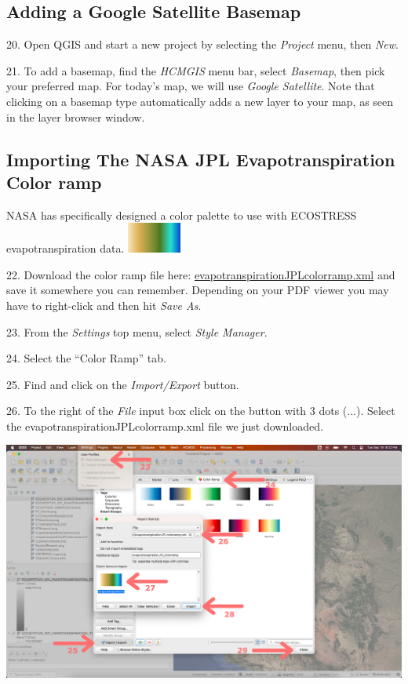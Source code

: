 \documentclass[oneside,a4paper,11pt,explicit]{book}
\begin{document}
\subsection{Adding a Google Satellite Basemap}

20. Open QGIS and start a new project by selecting the \textit{Project} menu, then \textit{New}.

21. To add a basemap, find the \textit{HCMGIS} menu bar, select \textit{Basemap}, then pick your preferred map. For today's map, we will use \textit{Google Satellite}. Note that clicking on a basemap type automatically adds a new layer to your map, as seen in the layer browser window.

\subsection{Importing The NASA JPL Evapotranspiration Color ramp}

NASA has specifically designed a color palette to use with ECOSTRESS evapotranspiration data. \includegraphics[height= 1cm]{ETcolors.png} 

\vspace{.5em}

22. Download the color ramp file here: \href{https://jeremydforsythe.github.io/icecream-tutorials/Tutorial6_Evaportranspiration1/evapotranspirationJPLcolorramp.xml}{evapotranspirationJPLcolorramp.xml} and save it somewhere you can remember. Depending on your PDF viewer you may have to right-click and then hit \textit{Save As}.

23. From the \textit{Settings} top menu, select \textit{Style Manager}.

24. Select the ``Color Ramp'' tab.

25. Find and click on the \textit{Import/Export} button.

26. To the right of the \textit{File} input box click on the button with 3 dots (...). Select the evapotranspirationJPLcolorramp.xml file we just downloaded.

\centerline{\includegraphics[width=\textwidth]{ImportColorramp.png}} 
\end{document}
